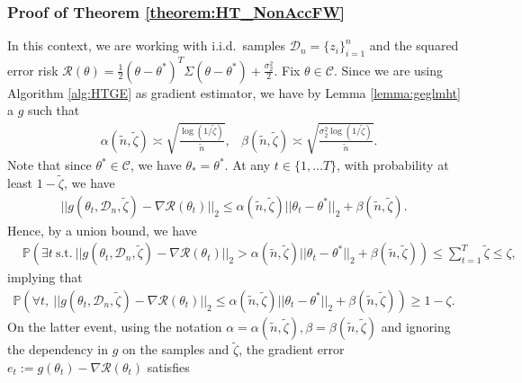 \documentclass{article}
\newcommand{\iid}{i.i.d.{\ }}
\begin{document}

\subsubsection{Proof of Theorem \ref{theorem:HT_NonAccFW}}\label{sec:ThmNonACCFWl>0}

In this context, we are working with \iid samples $\mathcal{D}_n = \{z_i\}_{i = 1}^n$ and the squared error risk $\mathcal{R}(\theta) = \frac{1}{2}(\theta - \theta^*)^T\Sigma(\theta - \theta^*) + \frac{\sigma_2^2}{2}$. Fix $\theta \in \mathcal{C}$. Since we are using Algorithm \ref{alg:HTGE} as gradient estimator, we have by Lemma \ref{lemma:geglmht} a $g$ such that
\begin{align*}
&\alpha(\widetilde{n}, \widetilde{\zeta}) \asymp \sqrt{\frac{\log(1/\widetilde{\zeta})}{\widetilde{n}}},
&\beta(\widetilde{n}, \widetilde{\zeta}) \asymp \sqrt{\frac{\sigma_2^2\log(1/\widetilde{\zeta})}{\widetilde{n}}}.
\end{align*}
Note that since $\theta^* \in \mathcal{C}$, we have  $\theta_* = \theta^*$. At any  $t \in \{1, \dots T\}$, with probability at least $1 - \widetilde{\zeta}$, we have
\begin{align*}
||g(\theta_t, \mathcal{D}_n, \widetilde{\zeta}) - \nabla\mathcal{R}(\theta_t)||_2 \leq \alpha(\widetilde{n}, \widetilde{\zeta})||\theta_t - \theta^*||_2 + \beta(\widetilde{n}, \widetilde{\zeta}).
\end{align*}
Hence, by a union bound, we have
\begin{align*}
 &\mathbb{P}(\exists t \ \mbox{s.t.} \ ||g(\theta_t, \mathcal{D}_n, \widetilde{\zeta}) - \nabla\mathcal{R}(\theta_t)||_2 > \alpha(\widetilde{n}, \widetilde{\zeta})||\theta_t - \theta^*||_2 + \beta(\widetilde{n}, \widetilde{\zeta})) \leq \sum_{t = 1}^T \widetilde{\zeta} \leq \zeta,
\end{align*}
implying that
\begin{align*}
 \mathbb{P}(\forall t, \ ||g(\theta_t, \mathcal{D}_n, \widetilde{\zeta}) - \nabla\mathcal{R}(\theta_t)||_2 \leq \alpha(\widetilde{n}, \widetilde{\zeta})||\theta_t - \theta^*||_2 + \beta(\widetilde{n}, \widetilde{\zeta})) \geq 1 - \zeta.
\end{align*}
On the latter event, using the notation $\alpha = \alpha(\widetilde{n}, \widetilde{\zeta}), \beta = \beta(\widetilde{n}, \widetilde{\zeta})$ and ignoring the dependency in $g$ on the samples and $\widetilde{\zeta}$, the gradient error $e_t := g(\theta_t) -\nabla\mathcal{R}(\theta_t)$ satisfies
\end{document}
